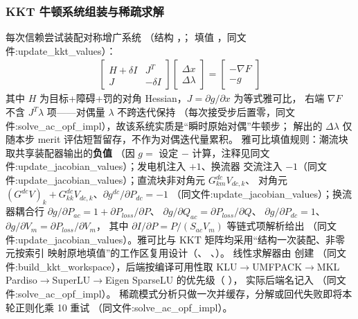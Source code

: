 \subsubsection*{KKT 牛顿系统组装与稀疏求解}
每次信赖尝试装配对称增广系统
（结构 ，；
填值 ，同文件:update\_kkt\_values）：
\begin{align*}
\begin{bmatrix} H+\delta I & J^{T}\\ J & -\delta I\end{bmatrix}
\begin{bmatrix}\Delta x\\ \Delta\lambda\end{bmatrix}
=
\begin{bmatrix}-\nabla F\\ -g\end{bmatrix}
\end{align*}
其中 $H$ 为目标+障碍+罚的对角 Hessian，$J=\partial g/\partial x$ 为等式雅可比，
右端 $\nabla F$ 不含 $J^{T}\lambda$ 项——对偶量 $\lambda$ 不跨迭代保持
（每次接受步后置零，同文件:solve\_ac\_opf\_impl），故该系统实质是``瞬时原始对偶''牛顿步；
解出的 $\Delta\lambda$ 仅随本步 merit 评估短暂留存，不作为对偶迭代量累积。
雅可比填值规则：潮流块取共享装配器输出的\textbf{负值}
（因 $g=$ 设定 $-$ 计算，注释见同文件:update\_jacobian\_values）；发电机注入 $+1$、换流器
交流注入 $-1$（同文件:update\_jacobian\_values）；直流块非对角元 $G^{dc}_{km}V_{dc,k}$、
对角元 $(G^{dc}V)_k+G^{dc}_{kk}V_{dc,k}$、$\partial g^{dc}/\partial P_{dc}=-1$
（同文件:update\_jacobian\_values）；换流器耦合行
$\partial g/\partial P_{ac}=1+\partial P_{loss}/\partial P$、
$\partial g/\partial Q_{ac}=\partial P_{loss}/\partial Q$、
$\partial g/\partial P_{dc}=1$、$\partial g/\partial V_m=\partial P_{loss}/\partial V_m$，
其中 $\partial I/\partial P=P/(S_{ac}V_m)$ 等链式项解析给出
（同文件:update\_jacobian\_values）。雅可比与 KKT 矩阵均采用``结构一次装配、非零元按索引
映射原地填值''的工作区复用设计（、
、）。
线性求解器由  创建
（同文件:build\_kkt\_workspace），后端按编译可用性取 KLU$\to$UMFPACK$\to$MKL
Pardiso$\to$SuperLU$\to$Eigen SparseLU 的优先级（
），
实际后端名记入 （同文件:solve\_ac\_opf\_impl）。
稀疏模式分析只做一次并缓存，分解或回代失败即将本轮正则化乘 10 重试
（同文件:solve\_ac\_opf\_impl）。

